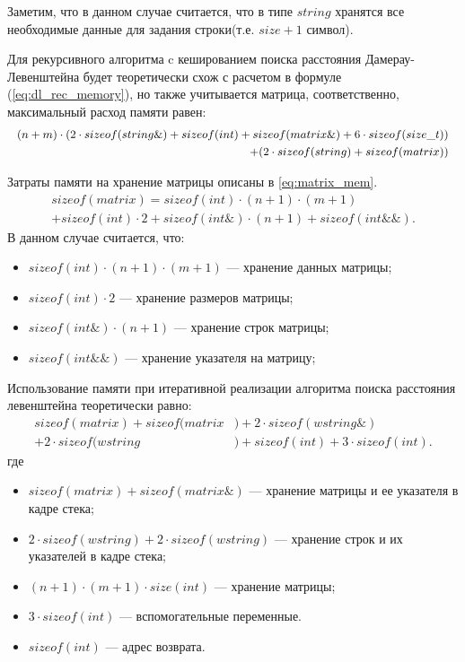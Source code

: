 Заметим, что в данном случае считается, что в типе $string$ хранятся все необходимые данные для задания строки(т.е. $size + 1$ символ).

Для рекурсивного алгоритма c кешированием поиска расстояния Дамерау-Левенштейна будет теоретически схож с расчетом в формуле (\ref{eq:dl_rec_memory}),
но также учитывается матрица, соответственно, максимальный расход памяти равен:
\begin{equation}
	\label{eq:dl_hash_memory}
    \small
	\begin{aligned}
		(n + m) \cdot (2 \cdot sizeof(string\&) + sizeof(int) + sizeof(matrix\&) + 6 \cdot sizeof(size\_t)) \\
        + (2 \cdot sizeof(string) + sizeof(matrix))
	\end{aligned}
\end{equation}

Затраты памяти на хранение матрицы описаны в  \ref{eq:matrix_mem}.
\begin{equation}
	\label{eq:matrix_mem}
    \begin{aligned}
	sizeof(matrix) = sizeof(int) \cdot (n+1) \cdot (m + 1)  \\
    + sizeof(int) \cdot 2 + sizeof(int\&) \cdot (n + 1) + sizeof(int\&\&).
    \end{aligned}
\end{equation}
В данном случае считается, что:
\begin{itemize}
	\item $sizeof(int) \cdot (n+1) \cdot (m + 1)$ --- хранение данных матрицы;
	\item $sizeof(int) \cdot 2$ --- хранение размеров матрицы;
	\item $sizeof(int\&) \cdot (n + 1)$ --- хранение строк матрицы;
	\item $sizeof(int\&\&)$ --- хранение указателя на матрицу;
\end{itemize}


Использование памяти при итеративной реализации алгоритма поиска расстояния левенштейна теоретически равно:
\begin{equation}
	\label{eq:lev_mtr_memory}
	\begin{aligned}
		sizeof(matrix) + sizeof(matrix&) + 2 \cdot sizeof(wstring\&)\\
        + 2 \cdot sizeof(wstring&) + sizeof(int) + 3 \cdot sizeof(int).
	\end{aligned}
\end{equation}
где 
\begin{itemize}
	\item $sizeof(matrix) + sizeof(matrix\&)$ --- хранение матрицы и ее указателя в кадре стека;
	\item $2 \cdot sizeof(wstring) + 2 \cdot sizeof(wstring)$ --- хранение строк и их указателей в кадре стека;
	\item $(n + 1) \cdot (m + 1) \cdot size(int)$ --- хранение матрицы;
	\item $3 \cdot sizeof(int)$ --- вспомогательные переменные.
	\item $sizeof(int)$ --- адрес возврата.
\end{itemize}

